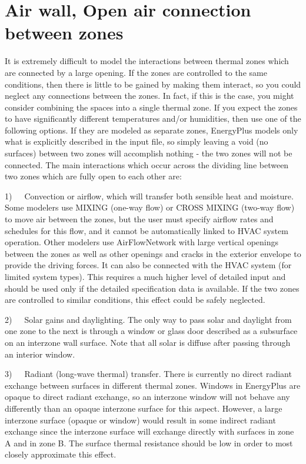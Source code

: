 \section{Air wall, Open air connection between zones}\label{air-wall-open-air-connection-between-zones}

It is extremely difficult to model the interactions between thermal zones which are connected by a large opening. If the zones are controlled to the same conditions, then there is little to be gained by making them interact, so you could neglect any connections between the zones. In fact, if this is the case, you might consider combining the spaces into a single thermal zone. If you expect the zones to have significantly different temperatures and/or humidities, then use one of the following options. If they are modeled as separate zones, EnergyPlus models only what is explicitly described in the input file, so simply leaving a void (no surfaces) between two zones will accomplish nothing - the two zones will not be connected. The main interactions which occur across the dividing line between two zones which are fully open to each other are:

1)~~~Convection or airflow, which will transfer both sensible heat and moisture. Some modelers use MIXING (one-way flow) or CROSS MIXING (two-way flow) to move air between the zones, but the user must specify airflow rates and schedules for this flow, and it cannot be automatically linked to HVAC system operation. Other modelers use AirFlowNetwork with large vertical openings between the zones as well as other openings and cracks in the exterior envelope to provide the driving forces. It can also be connected with the HVAC system (for limited system types). This requires a much higher level of detailed input and should be used only if the detailed specification data is available. If the two zones are controlled to similar conditions, this effect could be safely neglected.

2)~~~Solar gains and daylighting. The only way to pass solar and daylight from one zone to the next is through a window or glass door described as a subsurface on an interzone wall surface. Note that all solar is diffuse after passing through an interior window.

3)~~~Radiant (long-wave thermal) transfer. There is currently no direct radiant exchange between surfaces in different thermal zones. Windows in EnergyPlus are opaque to direct radiant exchange, so an interzone window will not behave any differently than an opaque interzone surface for this aspect. However, a large interzone surface (opaque or window) would result in some indirect radiant exchange since the interzone surface will exchange directly with surfaces in zone A and in zone B. The surface thermal resistance should be low in order to most closely approximate this effect.

